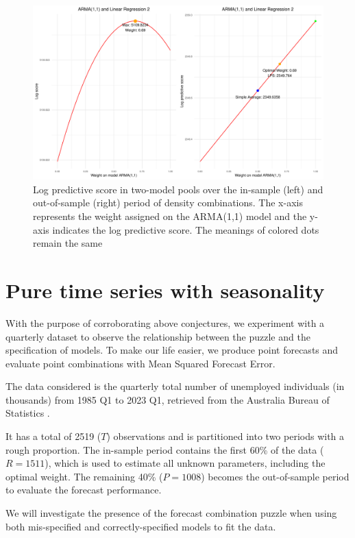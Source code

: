 \documentclass{monashthesis}
\begin{document}
\begin{figure}[ht]
\centering
\includegraphics[scale=0.5]{figures/SP500_stationary.pdf}
\caption{Log predictive score in two-model pools over the in-sample (left) and out-of-sample (right) period of density combinations. The x-axis represents the weight assigned on the ARMA(1,1) model and the y-axis indicates the log predictive score. The meanings of colored dots remain the same}
\label{fig:stat}
\end{figure}

\hypertarget{pure-time-series-with-seasonality}{%
\section{Pure time series with seasonality}\label{pure-time-series-with-seasonality}}

With the purpose of corroborating above conjectures, we experiment with a quarterly dataset to observe the relationship between the puzzle and the specification of models. To make our life easier, we produce point forecasts and evaluate point combinations with Mean Squared Forecast Error.

The data considered is the quarterly total number of unemployed individuals (in thousands) from 1985 Q1 to 2023 Q1, retrieved from the Australia Bureau of Statistics \autocite{ABS}.

It has a total of 2519 (\(T\)) observations and is partitioned into two periods with a rough proportion. The in-sample period contains the first 60\% of the data (\(R = 1511\)), which is used to estimate all unknown parameters, including the optimal weight. The remaining 40\% (\(P = 1008\)) becomes the out-of-sample period to evaluate the forecast performance.

We will investigate the presence of the forecast combination puzzle when using both mis-specified and correctly-specified models to fit the data.
\end{document}
